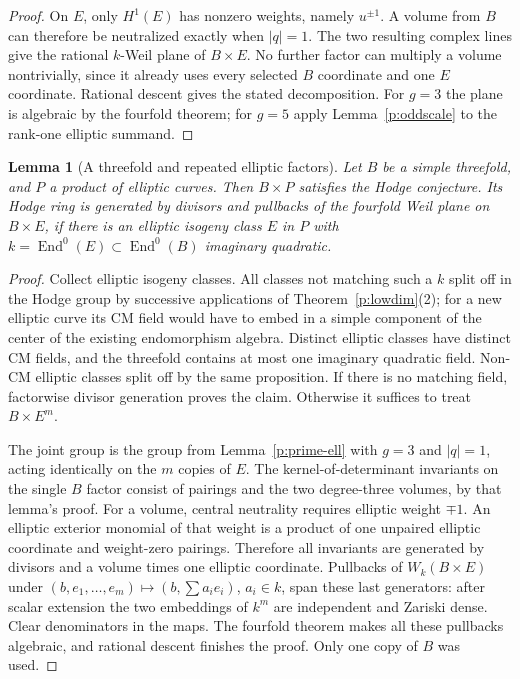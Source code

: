 \documentclass[11pt,reqno]{article}
\theoremstyle{emphasizedplain}
\theoremstyle{emphasizeddefinition}
\theoremstyle{emphasizeddefinition}
\newtheorem{prelemma}{Lemma}
\DeclareMathOperator{\End}{End}
\begin{document}
\begin{proof}
On $E$, only $H^1(E)$ has nonzero weights, namely $u^{\pm1}$.
A volume from $B$ can therefore be neutralized exactly when $|q|=1$.
The two resulting complex lines give the rational $k$-Weil plane of
$B\times E$. No further factor can multiply a volume nontrivially,
since it already uses every selected $B$ coordinate and one $E$
coordinate. Rational descent gives the stated decomposition.
For $g=3$ the plane is algebraic by the fourfold theorem; for $g=5$
apply Lemma~\ref{p:oddscale} to the rank-one elliptic summand.
\end{proof}

\begin{prelemma}[A threefold and repeated elliptic factors]
\label{p:three-ell}
Let $B$ be a simple threefold, and $P$ a product of elliptic curves.
Then $B\times P$ satisfies the Hodge conjecture. Its Hodge ring is
generated by divisors and pullbacks of the fourfold Weil plane on
$B\times E$, if there is an elliptic isogeny class $E$ in $P$ with
$k=\End^0(E)\subset\End^0(B)$ imaginary quadratic.
\end{prelemma}
\begin{proof}
Collect elliptic isogeny classes. All classes not matching such a $k$
split off in the Hodge group by successive applications of
Theorem~\ref{p:lowdim}(2); for a new elliptic curve its CM field would
have to embed in a simple component of the center of the existing
endomorphism algebra. Distinct elliptic classes have distinct CM fields,
and the threefold contains at most one imaginary quadratic field.
Non-CM elliptic classes split off by the same proposition.
If there is no matching field, factorwise divisor generation proves the
claim. Otherwise it suffices to treat $B\times E^m$.

The joint group is the group from Lemma~\ref{p:prime-ell} with $g=3$
and $|q|=1$, acting identically on the $m$ copies of $E$.
The kernel-of-determinant invariants on the single $B$ factor consist of
pairings and the two degree-three volumes, by that lemma's proof.
For a volume, central neutrality requires elliptic weight $\mp1$.
An elliptic exterior monomial of that weight is a product of one
unpaired elliptic coordinate and weight-zero pairings. Therefore all
invariants are generated by divisors and a volume times one elliptic
coordinate. Pullbacks of $W_k(B\times E)$ under
$(b,e_1,\ldots,e_m)\mapsto(b,\sum a_i e_i)$, $a_i\in k$, span these
last generators: after scalar extension the two embeddings of $k^m$
are independent and Zariski dense. Clear denominators in the maps.
The fourfold theorem makes all these pullbacks algebraic, and rational
descent finishes the proof. Only one copy of $B$ was used.
\end{proof}
\end{document}
